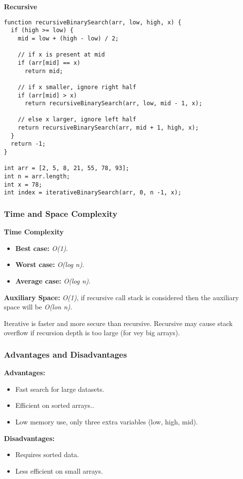 \textbf{Recursive}

\begin{lstlisting}[style=general]
function recursiveBinarySearch(arr, low, high, x) {
  if (high >= low) {
    mid = low + (high - low) / 2;

    // if x is present at mid
    if (arr[mid] == x)
      return mid;

    // if x smaller, ignore right half
    if (arr[mid] > x)
      return recursiveBinarySearch(arr, low, mid - 1, x);

    // else x larger, ignore left half
    return recursiveBinarySearch(arr, mid + 1, high, x);
  }
  return -1;
}

int arr = [2, 5, 8, 21, 55, 78, 93];
int n = arr.length;
int x = 78;
int index = iterativeBinarySearch(arr, 0, n -1, x);
\end{lstlisting}

\subsubsection{Time and Space Complexity}

\textbf{Time Complexity}

\begin{itemize}
  \item \textbf{Best case:} \textit{O(1)}.
  \item \textbf{Worst case:} \textit{O(log n)}.
  \item \textbf{Average case:} \emph{O(log n)}.
\end{itemize}

\textbf{Auxiliary Space:} \textit{O(1)}, if recursive call stack is considered then the auxiliary space will be \textit{O(lon n)}.

Iterative is faster and more secure than recursive. Recursive may cause stack overflow if recursion depth is too large (for vey big arrays).

\subsubsection{Advantages and Disadvantages}

\textbf{Advantages:}

\begin{itemize}
  \item Fast search for large datasets.
  \item Efficient on sorted arrays..
  \item Low memory use, only three extra variables (low, high, mid).
\end{itemize}

\textbf{Disadvantages:}

\begin{itemize}
  \item Requires sorted data.
  \item Less efficient on small arrays.
\end{itemize}
